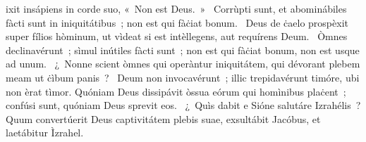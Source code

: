 \psalmChapterWithInscription{}
{ }
{%
ixit insápiens in corde suo, «~Non est Deus.~»
~Corrùpti sunt, et abominábiles fàcti sunt in iniquitátibus~; non est qui fàċiat bonum. 
~Deus de ċaelo prospèxit super fílios hòminum, ut vìdeat si est intèllegens, aut requírens Deum. 
~Òmnes declinavérunt~; sìmul inútiles fàcti sunt~; non est qui fàċiat bonum, non est usque ad unum. 
~¿~Nonne scient òmnes qui operàntur iniquitátem, qui dévorant plebem meam ut ċìbum panis~? 
~Deum non invocavérunt~; illic trepidavérunt timóre, ubi non èrat tìmor. Quóniam Deus dissipávit òssua eórum qui homìnibus plaċent~; confúsi sunt, quóniam Deus sprevit eos. 
~¿~Quìs dabit e Sióne salutáre Izrahélis~? Quum convertúerit Deus captivitátem plebis suae, exsultábit Jacóbus, et laetábitur Ìzrahel. 
}
